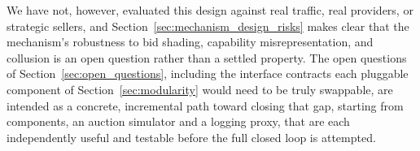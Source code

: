 We have not, however, evaluated this
design against real traffic, real providers, or strategic sellers, and
Section~\ref{sec:mechanism_design_risks} makes clear that the mechanism's
robustness to bid shading, capability misrepresentation, and collusion is
an open question rather than a settled property. The open questions of
Section~\ref{sec:open_questions}, including the interface contracts each
pluggable component of Section~\ref{sec:modularity} would need to be
truly swappable, are intended as a concrete, incremental path toward
closing that gap, starting from components, an auction simulator and a
logging proxy, that are each independently useful and testable before the
full closed loop is attempted.
